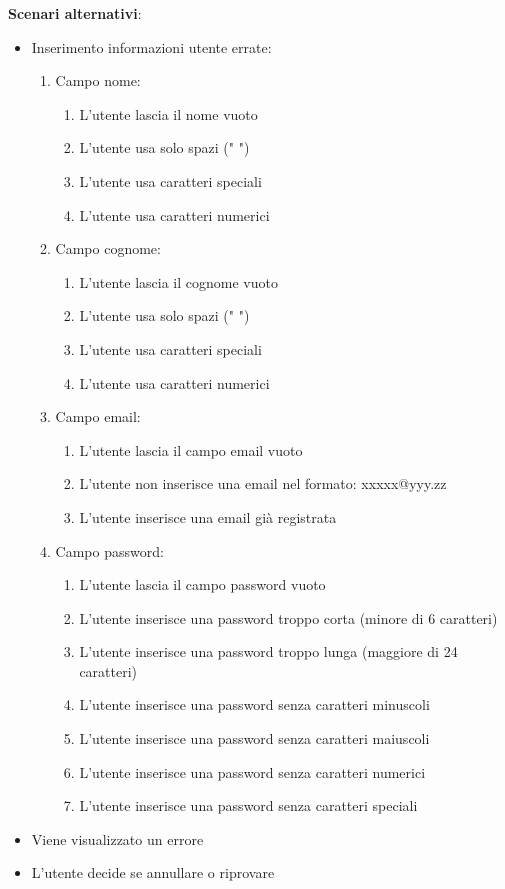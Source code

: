 \textbf{Scenari alternativi}:
\begin{itemize}
    \item Inserimento informazioni utente errate: 
    \begin{enumerate}
        \item Campo nome:
        \begin{enumerate}
            \item L'utente lascia il nome vuoto
            \item L'utente usa solo spazi (" ") 
            \item L'utente usa caratteri speciali
            \item L'utente usa caratteri numerici
        \end{enumerate}
        \item Campo cognome:
        \begin{enumerate}
            \item L'utente lascia il cognome vuoto
            \item L'utente usa solo spazi (" ") 
            \item L'utente usa caratteri speciali
            \item L'utente usa caratteri numerici
        \end{enumerate}
        \item Campo email:
        \begin{enumerate}
            \item L'utente lascia il campo email vuoto
            \item L'utente non inserisce una email nel formato: xxxxx@yyy.zz
            \item L'utente inserisce una email già registrata
        \end{enumerate}
        \item Campo password:
        \begin{enumerate}
            \item L'utente lascia il campo password vuoto
            \item L'utente inserisce una password troppo corta (minore di 6 caratteri)
            \item L'utente inserisce una password troppo lunga (maggiore di 24 caratteri)
            \item L'utente inserisce una password senza caratteri minuscoli
            \item L'utente inserisce una password senza caratteri maiuscoli
            \item L'utente inserisce una password senza caratteri numerici
            \item L'utente inserisce una password senza caratteri speciali
        \end{enumerate}
    \end{enumerate}
    \item Viene visualizzato un errore
    \item L'utente decide se annullare o riprovare
\end{itemize}

